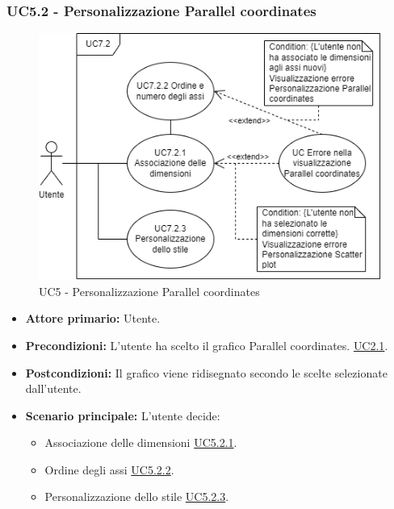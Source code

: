 \subsubsection{UC5.2 - Personalizzazione Parallel coordinates}
\label{sec:UC5.2}
\begin{figure}[h!]
	\centering
	\includegraphics[scale=0.55]{../../assets/personalizzazioneParallelCoordinates.drawio.png}
	\caption{UC5 - Personalizzazione Parallel coordinates}
\end{figure}
\begin{itemize}
    \item \textbf{Attore primario:} Utente.
	\item \textbf{Precondizioni:} L'utente ha scelto il grafico Parallel coordinates. \hyperref[sec:UC2.1]{UC2.1}.
	\item \textbf{Postcondizioni:} Il grafico viene ridisegnato secondo le scelte selezionate dall'utente.
	\item \textbf{Scenario principale:} L'utente decide:
	\begin{itemize}
        \item Associazione delle dimensioni \hyperref[sec:UC5.2.1]{UC5.2.1}.
        \item Ordine degli assi \hyperref[sec:UC5.2.2]{UC5.2.2}.
        \item Personalizzazione dello stile \hyperref[sec:UC5.2.3]{UC5.2.3}.
    \end{itemize}
\end{itemize}

